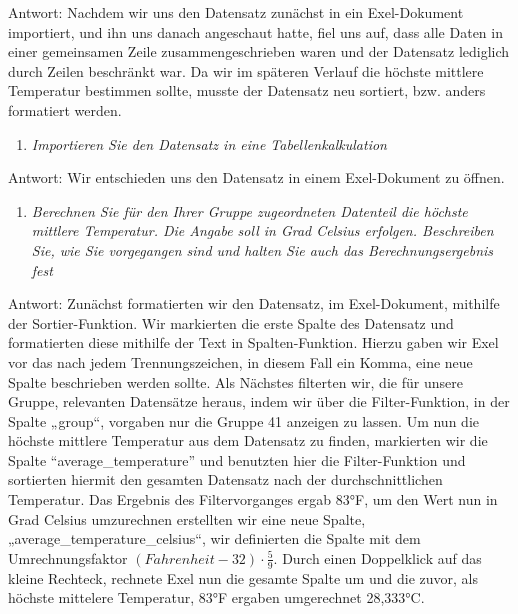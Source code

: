 \documentclass{article}
\begin{document}
\noindent %
Antwort: Nachdem wir uns den Datensatz zunächst in ein Exel-Dokument importiert, und ihn uns danach angeschaut hatte, fiel uns auf, dass alle Daten in einer gemeinsamen Zeile zusammengeschrieben waren und der Datensatz lediglich durch Zeilen beschränkt war. Da wir im späteren Verlauf die höchste mittlere Temperatur bestimmen sollte, musste der Datensatz neu sortiert, bzw. anders formatiert werden.  

\begin{enumerate}[resume] %
    \item \textit{Importieren Sie den Datensatz in eine Tabellenkalkulation}
\end{enumerate}

\noindent 
Antwort: Wir entschieden uns den Datensatz in einem Exel-Dokument zu öffnen. 

\begin{enumerate}[resume]
    \item \textit{Berechnen Sie für den Ihrer Gruppe zugeordneten Datenteil die höchste mittlere Temperatur. Die Angabe soll in Grad Celsius erfolgen. Beschreiben Sie, wie Sie vorgegangen sind und halten Sie auch das Berechnungsergebnis fest}
\end{enumerate}

\noindent 
Antwort: Zunächst formatierten wir den Datensatz, im Exel-Dokument, mithilfe der Sortier-Funktion. Wir markierten die erste Spalte des Datensatz und formatierten diese mithilfe der Text in Spalten-Funktion. Hierzu gaben wir Exel vor das nach jedem Trennungszeichen, in diesem Fall ein Komma, eine neue Spalte beschrieben werden sollte. Als Nächstes filterten wir, die für unsere Gruppe, relevanten Datensätze heraus, indem wir über die Filter-Funktion, in der Spalte „group“, vorgaben nur die Gruppe 41 anzeigen zu lassen. Um nun die höchste mittlere Temperatur aus dem Datensatz zu finden, markierten wir die Spalte “average\_temperature” und benutzten hier die Filter-Funktion und sortierten hiermit den gesamten Datensatz nach der durchschnittlichen Temperatur. Das Ergebnis des Filtervorganges ergab 83°F, um den Wert nun in Grad Celsius umzurechnen erstellten wir eine neue Spalte, „average\_temperature\_celsius“, wir definierten die Spalte mit dem Umrechnungsfaktor $(Fahrenheit - 32) \cdot \frac{5}{9}$. Durch einen Doppelklick auf das kleine Rechteck, rechnete Exel nun die gesamte Spalte um und die zuvor, als höchste mittelere Temperatur, 83°F ergaben umgerechnet 28,333°C.
\end{document}
